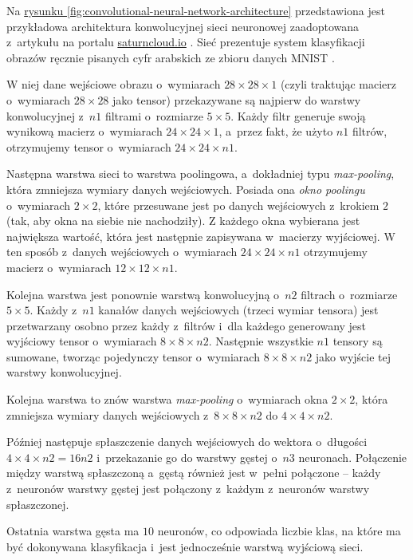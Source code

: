 Na \hyperref[fig:convolutional-neural-network-architecture]{rysunku \ref*{fig:convolutional-neural-network-architecture}} przedstawiona jest przykładowa architektura konwolucyjnej sieci neuronowej zaadoptowana z~artykułu na portalu \url{saturncloud.io} \cite{saha2018comprehensive}.
Sieć prezentuje system klasyfikacji obrazów ręcznie pisanych cyfr arabskich ze zbioru danych MNIST \cite{mnist}.

W niej dane wejściowe obrazu o~wymiarach $28 \times 28 \times 1$ (czyli traktując macierz o~wymiarach $28 \times 28$ jako tensor) przekazywane są najpierw do warstwy konwolucyjnej z~$n1$ filtrami o~rozmiarze $5 \times 5$.
Każdy filtr generuje swoją wynikową macierz o~wymiarach $24 \times 24 \times 1$, a~przez fakt, że użyto $n1$ filtrów, otrzymujemy tensor o~wymiarach $24 \times 24 \times n1$.

Następna warstwa sieci to warstwa poolingowa, a~dokładniej typu \emph{max-pooling}, która zmniejsza wymiary danych wejściowych.
Posiada ona \emph{okno poolingu} o~wymiarach $2 \times 2$, które przesuwane jest po danych wejściowych z~krokiem $2$ (tak, aby okna na siebie nie nachodziły).
Z każdego okna wybierana jest największa wartość, która jest następnie zapisywana w~macierzy wyjściowej.
W ten sposób z~danych wejściowych o~wymiarach $24 \times 24 \times n1$ otrzymujemy macierz o~wymiarach $12 \times 12 \times n1$.

Kolejna warstwa jest ponownie warstwą konwolucyjną o~$n2$ filtrach o~rozmiarze $5 \times 5$.
Każdy z~$n1$ kanałów danych wejściowych (trzeci wymiar tensora) jest przetwarzany osobno przez każdy z~filtrów i~dla każdego generowany jest wyjściowy tensor o~wymiarach $8 \times 8 \times n2$.
Następnie wszystkie $n1$ tensory są sumowane, tworząc pojedynczy tensor o~wymiarach $8 \times 8 \times n2$ jako wyjście tej warstwy konwolucyjnej.

Kolejna warstwa to znów warstwa \emph{max-pooling} o~wymiarach okna $2 \times 2$, która zmniejsza wymiary danych wejściowych z~$8 \times 8 \times n2$ do $4 \times 4 \times n2$.

Później następuje spłaszczenie danych wejściowych do wektora o~długości $4 \times 4 \times n2 = 16n2$ i~przekazanie go do warstwy gęstej o~$n3$ neuronach.
Połączenie między warstwą spłaszczoną a~gęstą również jest w~pełni połączone -- każdy z~neuronów warstwy gęstej jest połączony z~każdym z~neuronów warstwy spłaszczonej.

Ostatnia warstwa gęsta ma $10$ neuronów, co odpowiada liczbie klas, na które ma być dokonywana klasyfikacja i~jest jednocześnie warstwą wyjściową sieci.

